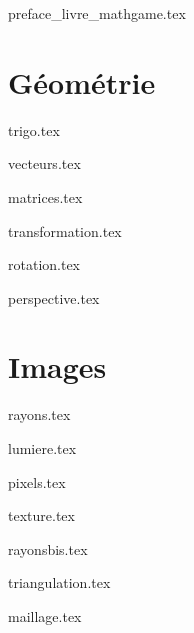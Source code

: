 \documentclass[10pt,twoside,openright]{report}
\begin{document}
\renewcommand{\contentsname}{Sommaire}

{preface_livre_mathgame.tex}
\debutchapitres
{}


\clearemptydoublepage


\part{Géométrie}

{trigo.tex}

{vecteurs.tex}

{matrices.tex}

{transformation.tex}

{rotation.tex}

{perspective.tex}



\part{Images}

{rayons.tex}

{lumiere.tex}

{pixels.tex}

{texture.tex}

{rayonsbis.tex}

{triangulation.tex}

{maillage.tex}


\end{document}
